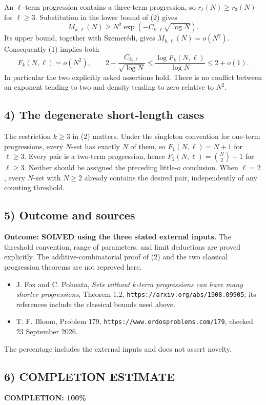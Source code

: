 An $\ell$-term progression contains a three-term progression, so
$r_\ell(N)\geq r_3(N)$ for $\ell\geq3$. Substitution in the lower
bound of (2) gives
\[
 M_{k,\ell}(N)\geq N^2\exp(-C_{k,\ell}\sqrt{\log N}).
\]
Its upper bound, together with Szemer\'edi, gives
$M_{k,\ell}(N)=o(N^2)$. Consequently (1) implies both
\[
 F_k(N,\ell)=o(N^2),\qquad
 2-\frac{C_{k,\ell}}{\sqrt{\log N}}
 \leq\frac{\log F_k(N,\ell)}{\log N}\leq2+o(1).
\]
In particular the two explicitly asked assertions hold. There is no
conflict between an exponent tending to two and density tending to
zero relative to $N^2$.

\subsection{4) The degenerate short-length cases}
The restriction $k\geq3$ in (2) matters. Under the singleton convention
for one-term progressions, every $N$-set has exactly $N$ of them, so
$F_1(N,\ell)=N+1$ for $\ell\geq3$. Every pair is a two-term
progression, hence $F_2(N,\ell)=\binom N2+1$ for $\ell\geq3$.
Neither should be assigned the preceding little-$o$ conclusion.
When $\ell=2$, every $N$-set with $N\geq2$ already contains the desired
pair, independently of any counting threshold.

\subsection{5) Outcome and sources}
\textbf{Outcome: SOLVED using the three stated external inputs.}
The threshold convention, range of parameters, and limit deductions
are proved explicitly. The additive-combinatorial proof of (2) and
the two classical progression theorems are not reproved here.
\begin{itemize}
\item J. Fox and C. Pohoata, \emph{Sets without $k$-term progressions
can have many shorter progressions}, Theorem 1.2,
\texttt{https://arxiv.org/abs/1908.09905}; its references include the
classical bounds used above.
\item T. F. Bloom, Problem 179,
\texttt{https://www.erdosproblems.com/179}, checked 23 September 2026.
\end{itemize}
The percentage includes the external inputs and does not assert novelty.
\subsection{6) COMPLETION ESTIMATE}
\textbf{COMPLETION: 100\%}
